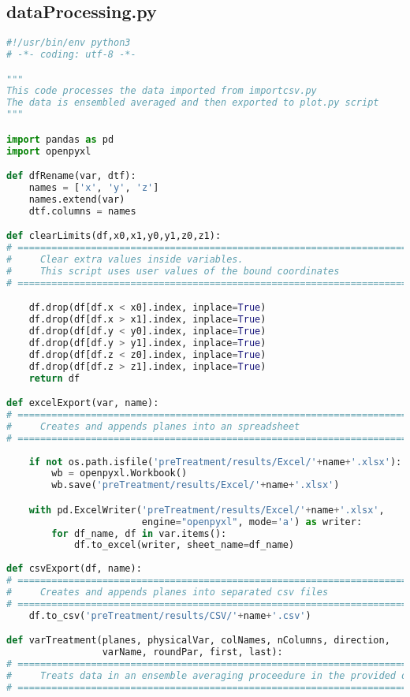 \documentclass[../main.tex]{subfiles}
\begin{document}
\subsection{dataProcessing.py}
\begin{lstlisting}[language=python]
#!/usr/bin/env python3
# -*- coding: utf-8 -*-

"""
This code processes the data imported from importcsv.py
The data is ensembled averaged and then exported to plot.py script
"""

import pandas as pd
import openpyxl

def dfRename(var, dtf):
    names = ['x', 'y', 'z']
    names.extend(var)
    dtf.columns = names

def clearLimits(df,x0,x1,y0,y1,z0,z1):
# =============================================================================
#     Clear extra values inside variables.
#     This script uses user values of the bound coordinates
# =============================================================================

    df.drop(df[df.x < x0].index, inplace=True)
    df.drop(df[df.x > x1].index, inplace=True)
    df.drop(df[df.y < y0].index, inplace=True)
    df.drop(df[df.y > y1].index, inplace=True)
    df.drop(df[df.z < z0].index, inplace=True)
    df.drop(df[df.z > z1].index, inplace=True)
    return df

def excelExport(var, name):
# =============================================================================
#     Creates and appends planes into an spreadsheet
# =============================================================================
    
    if not os.path.isfile('preTreatment/results/Excel/'+name+'.xlsx'):
        wb = openpyxl.Workbook()
        wb.save('preTreatment/results/Excel/'+name+'.xlsx')

    with pd.ExcelWriter('preTreatment/results/Excel/'+name+'.xlsx',
                        engine="openpyxl", mode='a') as writer:
        for df_name, df in var.items():
            df.to_excel(writer, sheet_name=df_name)
            
def csvExport(df, name):
# =============================================================================
#     Creates and appends planes into separated csv files
# =============================================================================
    df.to_csv('preTreatment/results/CSV/'+name+'.csv')

def varTreatment(planes, physicalVar, colNames, nColumns, direction,
                 varName, roundPar, first, last):
# =============================================================================
#     Treats data in an ensemble averaging proceedure in the provided direction
# =============================================================================


\end{lstlisting}
\end{document}
